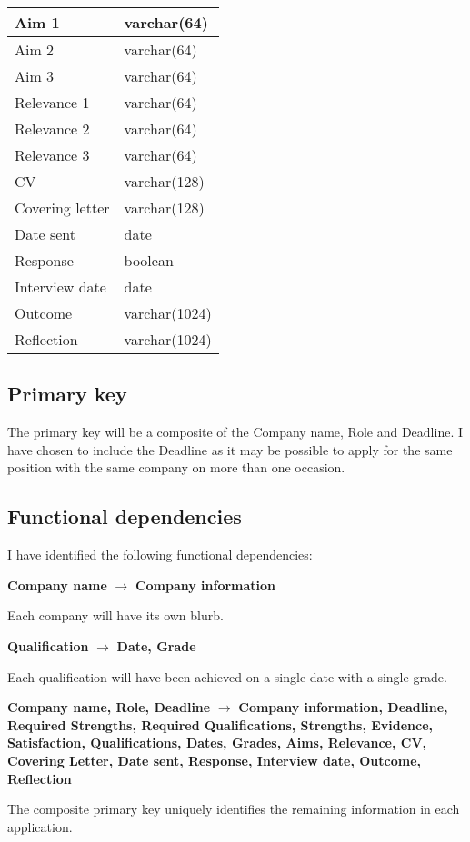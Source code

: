 \documentclass[a4paper, twoside]{article}
\begin{document}
\begin{center}
\begin{tabular}{|l|l|}
Aim 1 & varchar(64) \\ \hline
Aim 2 & varchar(64) \\ \hline
Aim 3 & varchar(64) \\ \hline
Relevance 1 & varchar(64) \\ \hline
Relevance 2 & varchar(64) \\ \hline
Relevance 3 & varchar(64) \\ \hline
CV & varchar(128) \\ \hline
Covering letter & varchar(128) \\ \hline
Date sent & date \\ \hline
Response & boolean \\ \hline
Interview date & date \\ \hline
Outcome & varchar(1024) \\ \hline
Reflection & varchar(1024) \\
\hline
\end{tabular}
\end{center}

\subsection{Primary key}
The primary key will be a composite of the Company name, Role and Deadline. I
have chosen to include the Deadline as it may be possible to apply for the same
position with the same company on more than one occasion.

\newpage
\subsection{Functional dependencies}
I have identified the following functional dependencies:

\begin{center}
  \textbf{Company name} $\rightarrow$ \textbf{Company information}
\end{center}
Each company will have its own blurb.

\begin{center}
  \textbf{Qualification} $\rightarrow$ \textbf{Date, Grade}
\end{center}
Each qualification will have been achieved on a single date with a single grade.

\begin{center}
  \textbf{Company name, Role, Deadline} $\rightarrow$ \textbf{Company
    information, Deadline, Required Strengths, Required Qualifications,
    Strengths, Evidence, Satisfaction, Qualifications, Dates, Grades, Aims,
    Relevance, CV, Covering Letter, Date sent, Response, Interview date,
  Outcome, Reflection}
\end{center}
The composite primary key uniquely identifies the remaining information in each
application.
\end{document}
